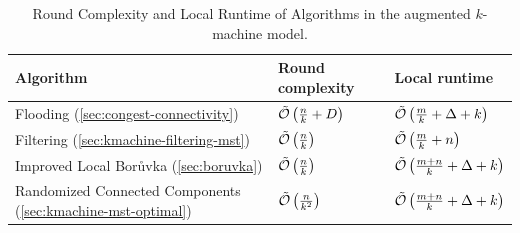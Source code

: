\begin{table}[t]
    \centering
    \begin{tabular}{@{}lll@{}}\toprule
        Algorithm                                                                        & Round complexity            & Local runtime                    \\\midrule
        Flooding  (\cref{sec:congest-connectivity})                               & \(\tilde{\mathcal{O}}\left(\frac{n}{k} + D\right)\) & \(\tilde{\mathcal{O}}\left(\frac{m}{k} + \Delta + k\right)\) \\
        Filtering (\cref{sec:kmachine-filtering-mst})                             & \(\tilde{\mathcal{O}}\left(\frac{n}{k}\right)\)     & \(\tilde{\mathcal{O}}\left(\frac{m}{k} + n\right)\)      \\
        Improved Local Bor\r{u}vka (\cref{sec:boruvka}) & \(\tilde{\mathcal{O}}\left(\frac{n}{k}\right)\)     & \(\tilde{\mathcal{O}}\left(\frac{m+n}{k} + \Delta + k\right)\)        \\
        Randomized Connected Components (\cref{sec:kmachine-mst-optimal})            & \(\tilde{\mathcal{O}}\left(\frac{n}{k^2}\right)\)   & \(\tilde{\mathcal{O}}\left(\frac{m+n}{k} + \Delta + k\right)\)
    \end{tabular}
    \caption{Round Complexity and Local Runtime of Algorithms in the augmented $k$-machine model.}
    \label{tbl:results}
\end{table}
